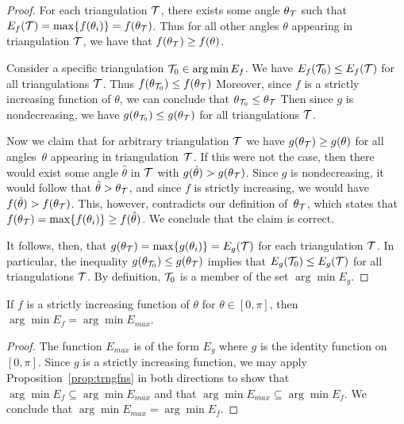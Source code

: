 \documentclass[final]{siamltex}
\begin{document}
\begin{proof}
  For each triangulation $\mathcal{T}$, there exists some angle
  $\theta_{\mathcal{T}}$ such that $E_{f}(\mathcal{T}) = \max \{f(\theta_i)\} =
  f(\theta_{\mathcal{T}})$.  Thus for all other angles $\theta$ appearing
  in triangulation $\mathcal{T}$, we have that $f(\theta_{\mathcal{T}}) \ge
  f(\theta)$.

  Consider a specific triangulation $\mathcal{T}_0 \in \arg\min E_{f}$.  We
  have $E_{f}(\mathcal{T}_0) \le E_{f}(\mathcal{T})$ for all triangulations
  $\mathcal{T}$.  Thus $f(\theta_{\mathcal{T}_0}) \le f(\theta_{\mathcal{T}})$
  Moreover, since $f$ is a strictly increasing function of $\theta$,
  we can conclude that $\theta_{\mathcal{T}_0} \le \theta_{\mathcal{T}}$ Then
  since $g$ is nondecreasing, we have $g(\theta_{\mathcal{T}_0}) \le
  g(\theta_{\mathcal{T}})$ for all triangulations $\mathcal{T}$.

  Now we claim that for arbitrary triangulation $\mathcal{T}$ we have
  $g(\theta_{\mathcal{T}}) \ge g(\theta)$ for all angles~$\theta$ appearing
  in triangulation~$\mathcal{T}$.  If this were not the case, then there
  would exist some angle $\hat\theta$ in $\mathcal{T}$ with $g(\hat\theta)
  > g(\theta_{\mathcal{T}})$.  Since $g$ is nondecreasing, it would follow
  that $\hat\theta > \theta_{\mathcal{T}}$, and since $f$ is strictly
  increasing, we would have $f(\hat\theta) > f(\theta_{\mathcal{T}})$.
  This, however, contradicts our definition of~$\theta_{\mathcal{T}}$, which
  states that $f(\theta_{\mathcal{T}}) = \max \{f(\theta_i)\} \ge
  f(\hat\theta)$.  We conclude that the claim is correct.

  It follows, then, that $g(\theta_{\mathcal{T}}) = \max \{g(\theta_i)\} =
  E_{g}(\mathcal{T})$ for each triangulation $\mathcal{T}$.  In particular, the
  inequality $g(\theta_{\mathcal{T}_0}) \le g(\theta_{\mathcal{T}})$ implies
  that $E_{g}(\mathcal{T}_0) \le E_{g}(\mathcal{T})$ for all triangulations
  $\mathcal{T}$.  By definition, $\mathcal{T}_0$ is a member of the set
  $\arg\min E_{g}$.
\end{proof}

\bigskip

\begin{corollary}
  If $f$ is a strictly increasing function of $\theta$ for $\theta \in
  [0, \pi]$, then $\arg\min E_{f} = \arg\min E_{max}$.
\end{corollary}

\begin{proof}
  The function $E_{max}$ is of the form $E_{g}$ where $g$ is the
  identity function on $[0, \pi]$.  Since $g$ is a strictly increasing
  function, we may apply Proposition~\ref{prop:trngfns} in both
  directions to show that $\arg\min E_{f} \subseteq \arg\min E_{max}$
  and that $\arg\min E_{max} \subseteq \arg\min E_{f}$.  We conclude
  that $\arg\min E_{max} = \arg\min E_{f}$.
\end{proof}
\end{document}
